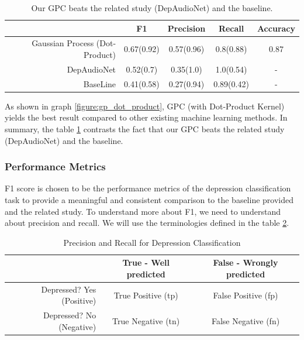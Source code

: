 \documentclass{article}
\begin{document}
 	    
        \begin{table}[h]
            \begin{center}
                \begin{tabular}{ | r | c | c | c | c | }
                 \hline
                                                    & \bfseries F1	& \bfseries Precision 	& \bfseries Recall      & \bfseries Accuracy \\ \hline
                 Gaussian Process (Dot-Product)		& 0.67(0.92) 	& 0.57(0.96)            & 0.8(0.88)			    & 0.87 \\ \hline
                 DepAudioNet	                    & 0.52(0.7) 	& 0.35(1.0)	    		& 1.0(0.54)             & -  \\ \hline
                 BaseLine                       	& 0.41(0.58) 	& 0.27(0.94)			& 0.89(0.42)            & -  \\ \hline
                 \end{tabular}
            \end{center}
        \caption{Our GPC beats the related study (DepAudioNet) and the baseline.}
        \label{table:comparisionOfGPModelWithOthers}
        \end{table}

        As shown in graph \ref{figure:gp_dot_product}, GPC (with Dot-Product Kernel) yields the best result compared to other existing machine learning methods. 
        In summary, the table \ref{table:comparisionOfGPModelWithOthers} contrasts the fact that our GPC beats the related study (DepAudioNet) and the baseline.

	 \subsubsection{Performance Metrics}
       F1 score is chosen to be the performance metrics of the depression classification task to provide a meaningful and consistent comparison to the baseline 
       provided and the related study. To understand more about F1,  we need to understand about precision and recall. 
       We will use the terminologies defined in the table \ref{table:precision_recall}.  
       
    
	\begin{table}[h!]
		\begin{center}
			\begin{tabular}{ | r | c | c | }
            \hline
                                            & \bfseries True - Well predicted	& \bfseries False - Wrongly predicted    \\ \hline
            Depressed? Yes (Positive)		& True Positive (tp) 	            & False Positive (fp)                    \\ \hline
            Depressed? No (Negative)	    & True Negative (tn) 	            & False Negative (fn)	    		     \\ \hline
            \end{tabular}
		\end{center}
		\caption{Precision and Recall for Depression Classification}
		\label{table:precision_recall}
	\end{table}
	
\end{document}
